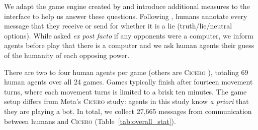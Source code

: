 \documentclass[oneside]{memoir}
\newcommand{\cicero}{\abr{Cicero} }
\newcommand{\abr}[1]{\textsc{#1}}
\begin{document}
We adapt the game engine created by \citet{NEURIPS2019_84b20b1f} and introduce
additional measures  to the interface to help us answer these
questions.
%
Following \citet{peskov2020takes}, humans annotate every message that they receive or send for whether it is a lie (truth/lie/neutral options). While \citet{meta2022human} asked \textit{ex post facto} if any opponents were a computer, we inform agents before play that there is a computer and we ask human agents their guess of the humanity of each opposing power.

There are two to four human agents per game (others are \cicero), totaling 69 human agents over all 24 games.
Games typically finish after fourteen movement turns, where each movement turns is limited to a brisk ten minutes. 
%
%
The game setup differs from Meta's \cicero study: agents in this study know \emph{a priori} that they are playing a bot.
%
%
In total, we collect 27,665 messages from communication between humans
and \cicero (Table~\ref{tab:overall_stat}).
\end{document}
